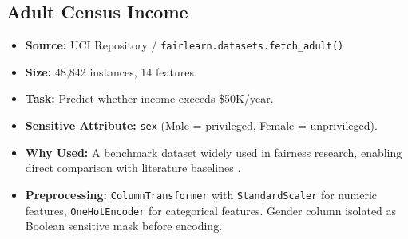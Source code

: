 \documentclass[12pt,a4paper]{article}
\begin{document}
\subsection{Adult Census Income}

\begin{itemize}
    \item \textbf{Source:} UCI Repository / \texttt{fairlearn.datasets.fetch\_adult()}
    \item \textbf{Size:} 48,842 instances, 14 features.
    \item \textbf{Task:} Predict whether income exceeds \$50K/year.
    \item \textbf{Sensitive Attribute:} \texttt{sex} (Male = privileged, Female = unprivileged).
    \item \textbf{Why Used:} A benchmark dataset widely used in fairness research, enabling direct comparison with literature baselines \cite{nagpal2024multiobj}.
    \item \textbf{Preprocessing:} \texttt{ColumnTransformer} with \texttt{StandardScaler} for numeric features, \texttt{OneHotEncoder} for categorical features. Gender column isolated as Boolean sensitive mask before encoding.
\end{itemize}
\end{document}
